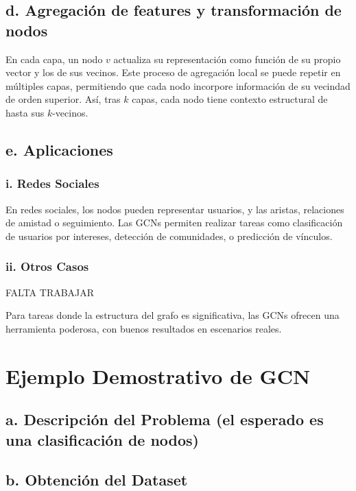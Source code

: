 \documentclass[11pt]{article} %
\begin{document}
\subsection{d. Agregación de features y transformación de nodos}

En cada capa, un nodo $v$ actualiza su representación como función de su propio vector y los de sus vecinos. Este proceso de agregación local se puede repetir en múltiples capas, permitiendo que cada nodo incorpore información de su vecindad de orden superior. Así, tras $k$ capas, cada nodo tiene contexto estructural de hasta sus $k$-vecinos.

\subsection{e. Aplicaciones}

\subsubsection{i. Redes Sociales}

En redes sociales, los nodos pueden representar usuarios, y las aristas, relaciones de amistad o seguimiento. Las GCNs permiten realizar tareas como clasificación de usuarios por intereses, detección de comunidades, o predicción de vínculos.

\subsubsection{ii. Otros Casos}
FALTA TRABAJAR

\vspace{1em}
\noindent Para tareas donde la estructura del grafo es significativa, las GCNs ofrecen una herramienta poderosa, con buenos resultados en escenarios reales.

\newpage 
{\section{Ejemplo Demostrativo de GCN }} \vspace{10pt}

\subsection{a. Descripción del Problema (el esperado es una clasificación de nodos)} 



\subsection{b. Obtención del Dataset}
\end{document}

